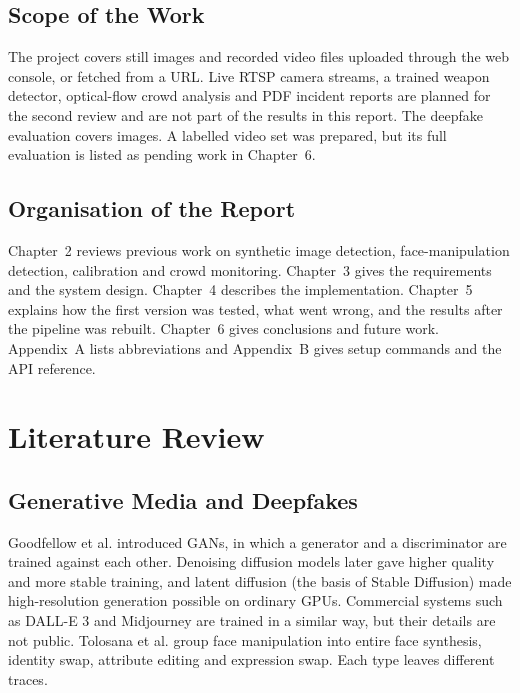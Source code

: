 \documentclass[12pt,a4paper,oneside]{report}
\begin{document}
\section{Scope of the Work}
The project covers still images and recorded video files uploaded through the web console, or fetched from a URL. Live RTSP camera streams, a trained weapon detector, optical-flow crowd analysis and PDF incident reports are planned for the second review and are not part of the results in this report. The deepfake evaluation covers images. A labelled video set was prepared, but its full evaluation is listed as pending work in Chapter~6.

\section{Organisation of the Report}
Chapter~2 reviews previous work on synthetic image detection, face-manipulation detection, calibration and crowd monitoring. Chapter~3 gives the requirements and the system design. Chapter~4 describes the implementation. Chapter~5 explains how the first version was tested, what went wrong, and the results after the pipeline was rebuilt. Chapter~6 gives conclusions and future work. Appendix~A lists abbreviations and Appendix~B gives setup commands and the API reference.

\chapter{Literature Review}

\section{Generative Media and Deepfakes}
Goodfellow et al.\cite{goodfellow2014} introduced GANs, in which a generator and a discriminator are trained against each other. Denoising diffusion models\cite{ho2020} later gave higher quality and more stable training, and latent diffusion\cite{rombach2022} (the basis of Stable Diffusion) made high-resolution generation possible on ordinary GPUs. Commercial systems such as DALL-E 3 and Midjourney are trained in a similar way, but their details are not public. Tolosana et al.\cite{tolosana2020} group face manipulation into entire face synthesis, identity swap, attribute editing and expression swap. Each type leaves different traces.
\end{document}
